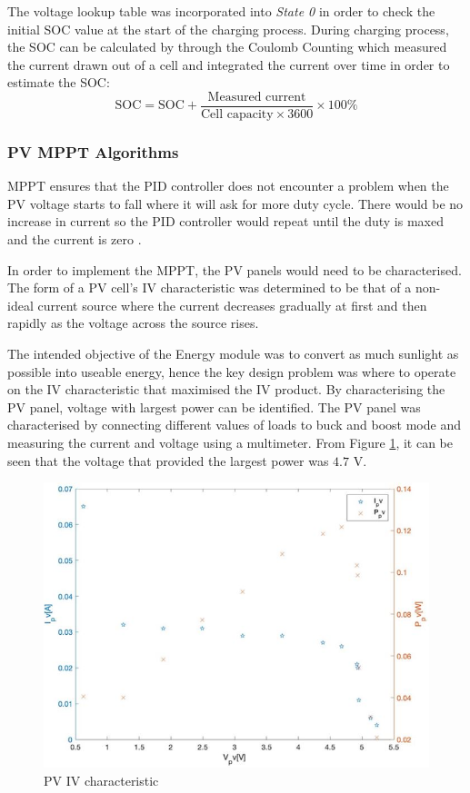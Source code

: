\documentclass[11pt, a4paper]{article}
\begin{document}
The voltage lookup table was incorporated into \textit{State 0} in order to check the initial SOC value at the start of the charging process. During charging process, the SOC can be calculated by through the Coulomb Counting which measured the current drawn out of a cell and integrated the current over time in order to estimate the SOC:
$$
    \text{SOC} = \text{SOC} + \frac{\text{Measured current}}{\text{Cell capacity} \times 3600} \times 100\%
$$

\pagebreak

\subsubsection{PV MPPT Algorithms}

MPPT ensures that the PID controller does not encounter a problem when the PV voltage starts to fall where it will ask for more duty cycle. There would be no increase in current so the PID controller would repeat until the duty is maxed and the current is zero \cite{PV_MPPT}.  

In order to implement the MPPT, the PV panels would need to be characterised. The form of a PV cell's IV characteristic was determined to be that of a non-ideal current source \cite{PV_current} where the current decreases gradually at first and then rapidly as the voltage across the source rises.

The intended objective of the Energy module was to convert as much sunlight as possible into useable energy, hence the key design problem was where to operate on the IV characteristic that maximised the IV product. By characterising the PV panel, voltage with largest power can be identified. The PV panel was characterised by connecting different values of loads to buck and boost mode and measuring the current and voltage using a multimeter. From Figure \ref{fig:IV_char}, it can be seen that the voltage that provided the largest power was $4.7$ V.

\begin{figure} [h!]
    \centering
    \includegraphics[scale=0.6]{Energy_PV_characteristic.JPG}
    \caption{PV IV characteristic}
    \label{fig:IV_char}
\end{figure}
\end{document}
